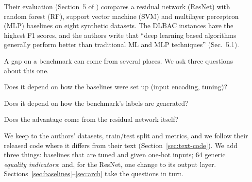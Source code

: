 \documentclass[11pt,a4paper]{article}
\begin{document}
Their evaluation (Section~5 of \cite{nobi2022}) compares a residual network (ResNet) with random forest (RF), support vector machine (SVM) and multilayer perceptron (MLP) baselines on eight synthetic datasets. The DLBAC instances have the highest F1 scores, and the authors write that ``deep learning based algorithms generally perform better than traditional ML and MLP techniques'' (Sec.~5.1).

A gap on a benchmark can come from several places. We ask three questions about this one.
\begin{description}[leftmargin=2.2cm, style=nextline, itemsep=2pt]
\item[Q1 Baseline configuration.] Does it depend on how the baselines were set up (input encoding, tuning)?
\item[Q2 Label structure.] Does it depend on how the benchmark's labels are generated?
\item[Q3 Architecture.] Does the advantage come from the residual network itself?
\end{description}
We keep to the authors' datasets, train/test split and metrics, and we follow their released code where it differs from their text (Section~\ref{sec:text-code}). We add three things: baselines that are tuned and given one-hot inputs; 64 generic \emph{equality indicators}; and, for the ResNet, one change to its output layer. Sections~\ref{sec:baselines}--\ref{sec:arch} take the questions in turn.
\end{document}
